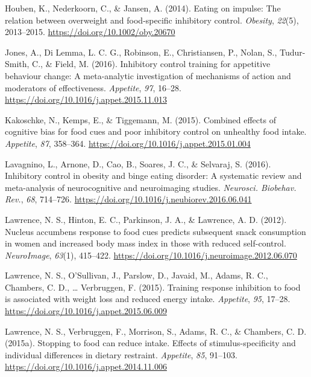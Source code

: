 \documentclass[man,floatsintext]{apa6}
\begin{document}
\leavevmode\hypertarget{ref-houben_eating_2014}{}%
Houben, K., Nederkoorn, C., \& Jansen, A. (2014). Eating on impulse: The relation between overweight and food-specific inhibitory control. \emph{Obesity}, \emph{22}(5), 2013--2015. \url{https://doi.org/10.1002/oby.20670}

\leavevmode\hypertarget{ref-jones_inhibitory_2016}{}%
Jones, A., Di Lemma, L. C. G., Robinson, E., Christiansen, P., Nolan, S., Tudur-Smith, C., \& Field, M. (2016). Inhibitory control training for appetitive behaviour change: A meta-analytic investigation of mechanisms of action and moderators of effectiveness. \emph{Appetite}, \emph{97}, 16--28. \url{https://doi.org/10.1016/j.appet.2015.11.013}

\leavevmode\hypertarget{ref-kakoschke_combined_2015-1}{}%
Kakoschke, N., Kemps, E., \& Tiggemann, M. (2015). Combined effects of cognitive bias for food cues and poor inhibitory control on unhealthy food intake. \emph{Appetite}, \emph{87}, 358--364. \url{https://doi.org/10.1016/j.appet.2015.01.004}

\leavevmode\hypertarget{ref-lavagnino_inhibitory_2016}{}%
Lavagnino, L., Arnone, D., Cao, B., Soares, J. C., \& Selvaraj, S. (2016). Inhibitory control in obesity and binge eating disorder: A systematic review and meta-analysis of neurocognitive and neuroimaging studies. \emph{Neurosci. Biobehav. Rev.}, \emph{68}, 714--726. \url{https://doi.org/10.1016/j.neubiorev.2016.06.041}

\leavevmode\hypertarget{ref-lawrence_nucleus_2012-1}{}%
Lawrence, N. S., Hinton, E. C., Parkinson, J. A., \& Lawrence, A. D. (2012). Nucleus accumbens response to food cues predicts subsequent snack consumption in women and increased body mass index in those with reduced self-control. \emph{NeuroImage}, \emph{63}(1), 415--422. \url{https://doi.org/10.1016/j.neuroimage.2012.06.070}

\leavevmode\hypertarget{ref-lawrence_training_2015}{}%
Lawrence, N. S., O'Sullivan, J., Parslow, D., Javaid, M., Adams, R. C., Chambers, C. D., \ldots{} Verbruggen, F. (2015). Training response inhibition to food is associated with weight loss and reduced energy intake. \emph{Appetite}, \emph{95}, 17--28. \url{https://doi.org/10.1016/j.appet.2015.06.009}

\leavevmode\hypertarget{ref-lawrence_stopping_2015-3}{}%
Lawrence, N. S., Verbruggen, F., Morrison, S., Adams, R. C., \& Chambers, C. D. (2015a). Stopping to food can reduce intake. Effects of stimulus-specificity and individual differences in dietary restraint. \emph{Appetite}, \emph{85}, 91--103. \url{https://doi.org/10.1016/j.appet.2014.11.006}
\end{document}
